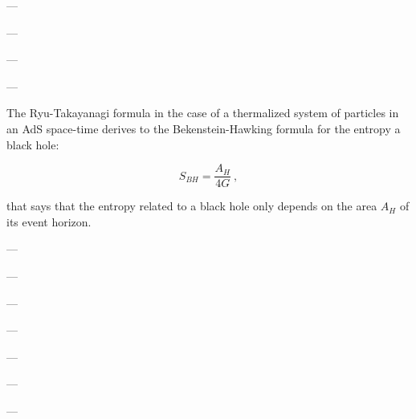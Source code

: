 \documentclass[twocolumn]{revtex4}
\providecommand{\eq}[2]{
    \begin{equation}
        #2
    \label{eq:#1}
    \end{equation}
}
\begin{document}
---

---

---

---

The Ryu-Takayanagi formula in the case of a thermalized system of particles in an AdS space-time derives to the Bekenstein-Hawking formula \cite{bekenstein_black_1973} for the entropy a black hole:
\eq{BH}{
    S_{BH} = \frac{ A_H }{ 4 G } \ ,
}
that says that the entropy related to a black hole only depends on the area $A_H$ of its event horizon.

---

---

---

---


\begin{acknowledgments}
    ---
    
    ---
    
    ---
    
\end{acknowledgments}




\end{document}
